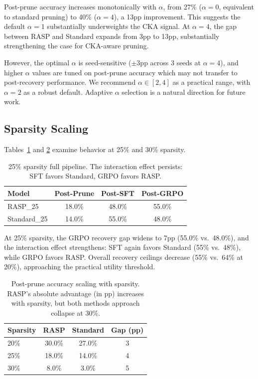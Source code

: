 \documentclass[11pt]{article}
\begin{document}
Post-prune accuracy increases monotonically with $\alpha$, from 27\% ($\alpha{=}0$, equivalent to standard pruning) to 40\% ($\alpha{=}4$), a 13pp improvement. This suggests the default $\alpha{=}1$ substantially underweights the CKA signal. At $\alpha{=}4$, the gap between RASP and Standard expands from 3pp to 13pp, substantially strengthening the case for CKA-aware pruning.

However, the optimal $\alpha$ is seed-sensitive ($\pm$3pp across 3 seeds at $\alpha{=}4$), and higher $\alpha$ values are tuned on post-prune accuracy which may not transfer to post-recovery performance. We recommend $\alpha \in [2, 4]$ as a practical range, with $\alpha{=}2$ as a robust default. Adaptive $\alpha$ selection is a natural direction for future work.

\subsection{Sparsity Scaling}
\label{sec:sparsity}

Tables~\ref{tab:sparsity25} and \ref{tab:sparsity_trend} examine behavior at 25\% and 30\% sparsity.

\begin{table}[t]
\centering
\caption{25\% sparsity full pipeline. The interaction effect persists: SFT favors Standard, GRPO favors RASP.}
\label{tab:sparsity25}
\begin{tabular}{lccc}
\toprule
\textbf{Model} & \textbf{Post-Prune} & \textbf{Post-SFT} & \textbf{Post-GRPO} \\
\midrule
RASP\_25 & 18.0\% & 48.0\% & 55.0\% \\
Standard\_25 & 14.0\% & 55.0\% & 48.0\% \\
\bottomrule
\end{tabular}
\end{table}

At 25\% sparsity, the GRPO recovery gap widens to 7pp (55.0\% vs.\ 48.0\%), and the interaction effect strengthens: SFT again favors Standard (55\% vs.\ 48\%), while GRPO favors RASP. Overall recovery ceilings decrease (55\% vs.\ 64\% at 20\%), approaching the practical utility threshold.

\begin{table}[t]
\centering
\caption{Post-prune accuracy scaling with sparsity. RASP's absolute advantage (in pp) increases with sparsity, but both methods approach collapse at 30\%.}
\label{tab:sparsity_trend}
\begin{tabular}{lccc}
\toprule
\textbf{Sparsity} & \textbf{RASP} & \textbf{Standard} & \textbf{Gap (pp)} \\
\midrule
20\% & 30.0\% & 27.0\% & 3 \\
25\% & 18.0\% & 14.0\% & 4 \\
30\% & 8.0\% & 3.0\% & 5 \\
\bottomrule
\end{tabular}
\end{table}
\end{document}
